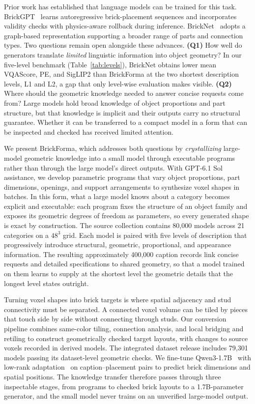 Prior work has established that language models can be trained for this task. BrickGPT~\cite{brickgpt} learns autoregressive brick-placement sequences and incorporates validity checks with physics-aware rollback during inference. BrickNet~\cite{bricknet} adopts a graph-based representation supporting a broader range of parts and connection types. Two questions remain open alongside these advances. \textbf{(Q1)} How well do generators translate \emph{limited} linguistic information into object geometry? In our five-level benchmark (Table~\ref{tab:levels}), BrickNet obtains lower mean VQAScore, PE, and SigLIP2 than BrickForma at the two shortest description levels, L1 and L2, a gap that only level-wise evaluation makes visible. \textbf{(Q2)} Where should the geometric knowledge needed to answer concise requests come from? Large models hold broad knowledge of object proportions and part structure, but that knowledge is implicit and their outputs carry no structural guarantee. Whether it can be transferred to a compact model in a form that can be inspected and checked has received limited attention.

We present BrickForma, which addresses both questions by \emph{crystallizing} large-model geometric knowledge into a small model through executable programs rather than through the large model's direct outputs. With GPT-6.1 Sol assistance, we develop parametric programs that vary object proportions, part dimensions, openings, and support arrangements to synthesize voxel shapes in batches.
In this form, what a large model knows about a category becomes explicit and executable: each program fixes the structure of an object family and exposes its geometric degrees of freedom as parameters, so every generated shape is exact by construction. The source collection contains 80,000 models across 21 categories on a $48^3$ grid. Each model is paired with five levels of description that progressively introduce structural, geometric, proportional, and appearance information. The resulting approximately 400,000 caption records link concise requests and detailed specifications to shared geometry, so that a model trained on them learns to supply at the shortest level the geometric details that the longest level states outright.

Turning voxel shapes into brick targets is where spatial adjacency and stud connectivity must be separated. A connected voxel volume can be tiled by pieces that touch side by side without connecting through studs. Our conversion pipeline combines same-color tiling, connection analysis, and local bridging and retiling to construct geometrically checked target layouts, with changes to source voxels recorded in derived models. The integrated dataset release includes 79,301 models passing its dataset-level geometric checks. We fine-tune Qwen3-1.7B~\cite{qwen3} with low-rank adaptation~\cite{lora} on caption--placement pairs to predict brick dimensions and spatial positions. The knowledge transfer therefore passes through three inspectable stages, from programs to checked brick layouts to a 1.7B-parameter generator, and the small model never trains on an unverified large-model output.

